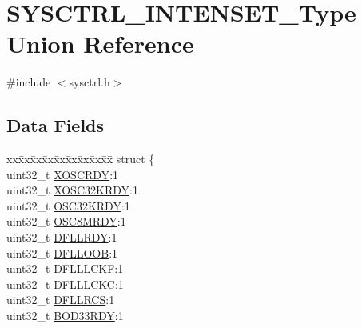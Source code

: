 \hypertarget{union_s_y_s_c_t_r_l___i_n_t_e_n_s_e_t___type}{}\section{S\+Y\+S\+C\+T\+R\+L\+\_\+\+I\+N\+T\+E\+N\+S\+E\+T\+\_\+\+Type Union Reference}
\label{union_s_y_s_c_t_r_l___i_n_t_e_n_s_e_t___type}


{\ttfamily \#include $<$sysctrl.\+h$>$}

\subsection*{Data Fields}
\begin{DoxyCompactItemize}
\item 
\begin{tabbing}
xx\=xx\=xx\=xx\=xx\=xx\=xx\=xx\=xx\=\kill
struct \{\\
\>uint32\_t \mbox{\hyperlink{union_s_y_s_c_t_r_l___i_n_t_e_n_s_e_t___type_ae3f4eaf046b9b3a9346c0d1d2d91cc06}{XOSCRDY}}:1\\
\>uint32\_t \mbox{\hyperlink{union_s_y_s_c_t_r_l___i_n_t_e_n_s_e_t___type_a8afcb31d4b37229559de2f9a205d8224}{XOSC32KRDY}}:1\\
\>uint32\_t \mbox{\hyperlink{union_s_y_s_c_t_r_l___i_n_t_e_n_s_e_t___type_ae7c0d69dbd8d57c9a1615479f6cc41e9}{OSC32KRDY}}:1\\
\>uint32\_t \mbox{\hyperlink{union_s_y_s_c_t_r_l___i_n_t_e_n_s_e_t___type_a6b0534423bae229796a1b7e1feef6929}{OSC8MRDY}}:1\\
\>uint32\_t \mbox{\hyperlink{union_s_y_s_c_t_r_l___i_n_t_e_n_s_e_t___type_a1edb42763dec361d286d7a22da8ac910}{DFLLRDY}}:1\\
\>uint32\_t \mbox{\hyperlink{union_s_y_s_c_t_r_l___i_n_t_e_n_s_e_t___type_a3a50f59df66d1c38f7bf4c0aa8c56efc}{DFLLOOB}}:1\\
\>uint32\_t \mbox{\hyperlink{union_s_y_s_c_t_r_l___i_n_t_e_n_s_e_t___type_aae17a5d3e587fb971abc5106079e77d0}{DFLLLCKF}}:1\\
\>uint32\_t \mbox{\hyperlink{union_s_y_s_c_t_r_l___i_n_t_e_n_s_e_t___type_ae19af414b302aae88bdb5c7bb986dd96}{DFLLLCKC}}:1\\
\>uint32\_t \mbox{\hyperlink{union_s_y_s_c_t_r_l___i_n_t_e_n_s_e_t___type_a4077d6d7cf1d872f4539d5d606472ab6}{DFLLRCS}}:1\\
\>uint32\_t \mbox{\hyperlink{union_s_y_s_c_t_r_l___i_n_t_e_n_s_e_t___type_a301491f5356d64c6590f374e8a876861}{BOD33RDY}}:1\\

\end{tabbing}
\end{DoxyCompactItemize}
